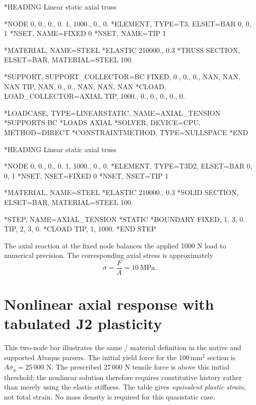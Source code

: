 \begin{dialectexamples}
\begin{femasterdeck}
*HEADING
Linear static axial truss

*NODE
0,    0., 0., 0.
1, 1000., 0., 0.
*ELEMENT, TYPE=T3, ELSET=BAR
0, 0, 1
*NSET, NAME=FIXED
0
*NSET, NAME=TIP
1

*MATERIAL, NAME=STEEL
*ELASTIC
210000., 0.3
*TRUSS SECTION, ELSET=BAR,
 MATERIAL=STEEL
100.

*SUPPORT, SUPPORT_COLLECTOR=BC
FIXED, 0., 0., 0., NAN, NAN, NAN
TIP, NAN, 0., 0., NAN, NAN, NAN
*CLOAD, LOAD_COLLECTOR=AXIAL
TIP, 1000., 0., 0., 0., 0., 0.

*LOADCASE, TYPE=LINEARSTATIC,
 NAME=AXIAL_TENSION
*SUPPORTS
BC
*LOADS
AXIAL
*SOLVER, DEVICE=CPU, METHOD=DIRECT
*CONSTRAINTMETHOD, TYPE=NULLSPACE
*END
\end{femasterdeck}
\begin{abaqusdeck}
*HEADING
Linear static axial truss

*NODE
0,    0., 0., 0.
1, 1000., 0., 0.
*ELEMENT, TYPE=T3D2, ELSET=BAR
0, 0, 1
*NSET, NSET=FIXED
0
*NSET, NSET=TIP
1

*MATERIAL, NAME=STEEL
*ELASTIC
210000., 0.3
*SOLID SECTION, ELSET=BAR,
 MATERIAL=STEEL
100.

*STEP, NAME=AXIAL_TENSION
*STATIC
*BOUNDARY
FIXED, 1, 3, 0.
TIP, 2, 3, 0.
*CLOAD
TIP, 1, 1000.
*END STEP
\end{abaqusdeck}
\end{dialectexamples}

The axial reaction at the fixed node balances the applied 1000 N load to numerical precision. The corresponding axial stress is approximately
\[
\sigma=\frac{F}{A}=10\ \mathrm{MPa}.
\]

\section{Nonlinear axial response with tabulated J2 plasticity}

This two-node bar illustrates the same / material definition in the native and supported Abaqus parsers. The initial yield force for the 100\,mm\(^2\) section is \(A\sigma_y=25\,000\) N. The prescribed 27\,000 N tensile force is above this initial threshold; the nonlinear solution therefore requires constitutive history rather than merely using the elastic stiffness. The table gives \emph{equivalent plastic strain}, not total strain. No mass density is required for this quasistatic case.

